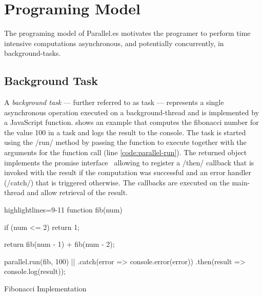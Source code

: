 \section{Programing Model}\label{sec:programing-model}
The programing model of Parallel.es motivates the programer to perform time intensive computations asynchronous, and potentially concurrently, in background-tasks. 

\subsection{Background Task}
A \textit{background task} --- further referred to as task --- represents a single asynchronous operation executed on a background-thread and is implemented by a JavaScript function.  shows an example that computes the fibonacci number for the value 100 in a task and logs the result to the console. The task is started using the \javascriptinline/run/ method by passing the function to execute together with the arguments for the function call (line \ref{code:parallel-run}). The returned object implements the promise interface~\cite[Section 18.3.18]{ecmaScript2015} allowing to register a \javascriptinline/then/ callback that is invoked with the result if the computation was successful and an error handler (\javascriptinline/catch/) that is triggered otherwise. The callbacks are executed on the main-thread and allow retrieval of the result. 


\begin{listing}
	\begin{javascriptcode*}{highlightlines={9-11}}
function fib(num) {
	if (num <= 2) {
    	return 1;
	}

	return fib(num - 1) + fib(num - 2);
}
        
parallel.run(fib, 100) |$\label{code:parallel-run}$|
	.catch(error => console.error(error))
	.then(result => console.log(result));	
	\end{javascriptcode*}

	\caption{Fibonacci Implementation}
	\label{fig:fibonacci-implementation}
\end{listing}

